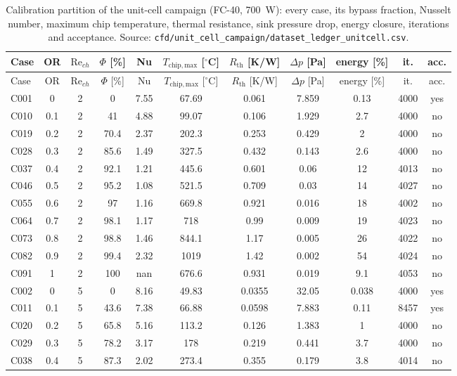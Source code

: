 \begin{longtable}{@{}lcccccccccc@{}}
\caption{Calibration partition of the unit-cell campaign (FC-40, 700~W): every case, its bypass fraction, Nusselt number, maximum chip temperature, thermal resistance, sink pressure drop, energy closure, iterations and acceptance. Source: \texttt{cfd/unit\_cell\_campaign/dataset\_ledger\_unitcell.csv}.}\label{tab:calibration_ledger}\\
\hline
Case & OR & $\mathrm{Re}_{ch}$ & $\Phi$ [\%] & Nu & $T_{\mathrm{chip,max}}$ [$^{\circ}$C] & $R_{\mathrm{th}}$ [K/W] & $\Delta p$ [Pa] & energy [\%] & it. & acc. \\
\hline
\endfirsthead
\hline
Case & OR & $\mathrm{Re}_{ch}$ & $\Phi$ [\%] & Nu & $T_{\mathrm{chip,max}}$ [$^{\circ}$C] & $R_{\mathrm{th}}$ [K/W] & $\Delta p$ [Pa] & energy [\%] & it. & acc. \\
\hline
\endhead
C001 & 0 & 2 & 0 & 7.55 & 67.69 & 0.061 & 7.859 & 0.13 & 4000 & yes \\
C010 & 0.1 & 2 & 41 & 4.88 & 99.07 & 0.106 & 1.929 & 2.7 & 4000 & no \\
C019 & 0.2 & 2 & 70.4 & 2.37 & 202.3 & 0.253 & 0.429 & 2 & 4000 & no \\
C028 & 0.3 & 2 & 85.6 & 1.49 & 327.5 & 0.432 & 0.143 & 2.6 & 4000 & no \\
C037 & 0.4 & 2 & 92.1 & 1.21 & 445.6 & 0.601 & 0.06 & 12 & 4013 & no \\
C046 & 0.5 & 2 & 95.2 & 1.08 & 521.5 & 0.709 & 0.03 & 14 & 4027 & no \\
C055 & 0.6 & 2 & 97 & 1.16 & 669.8 & 0.921 & 0.016 & 18 & 4002 & no \\
C064 & 0.7 & 2 & 98.1 & 1.17 & 718 & 0.99 & 0.009 & 19 & 4023 & no \\
C073 & 0.8 & 2 & 98.8 & 1.46 & 844.1 & 1.17 & 0.005 & 26 & 4022 & no \\
C082 & 0.9 & 2 & 99.4 & 2.32 & 1019 & 1.42 & 0.002 & 54 & 4024 & no \\
C091 & 1 & 2 & 100 & nan & 676.6 & 0.931 & 0.019 & 9.1 & 4053 & no \\
C002 & 0 & 5 & 0 & 8.16 & 49.83 & 0.0355 & 32.05 & 0.038 & 4000 & yes \\
C011 & 0.1 & 5 & 43.6 & 7.38 & 66.88 & 0.0598 & 7.883 & 0.11 & 8457 & yes \\
C020 & 0.2 & 5 & 65.8 & 5.16 & 113.2 & 0.126 & 1.383 & 1 & 4000 & no \\
C029 & 0.3 & 5 & 78.2 & 3.17 & 178 & 0.219 & 0.441 & 3.7 & 4000 & no \\
C038 & 0.4 & 5 & 87.3 & 2.02 & 273.4 & 0.355 & 0.179 & 3.8 & 4014 & no \\

\end{longtable}
